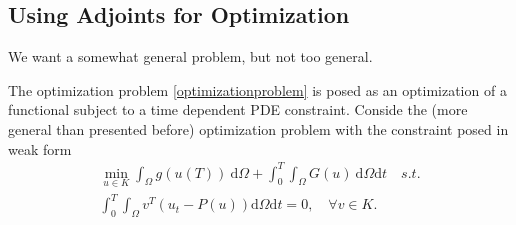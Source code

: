 \documentclass[10pt]{article}
\renewcommand{\d}{\mathrm{d}}
\begin{document}
{\subsection{Using Adjoints for Optimization}

We want a somewhat general problem, but not too general.

The optimization problem \ref{optimizationproblem} is posed as an optimization of a functional subject to a time dependent PDE constraint.
Conside the (more general than presented before)
optimization problem with the constraint posed in weak form
\begin{eqnarray}
  \min_{u \in K} \int_{\Omega}g(u(T)) \ \d \Omega + \int_0^T\int_{\Omega}G(u) \ \d \Omega \d t \quad s.t. \\ \nonumber
  \int_0^T \int_{\Omega} v^T( u_t- P( u))  \d \Omega \d t = 0, \quad \forall v \in K.
\label{newoptimizationproblem}
\end{eqnarray}


}
\end{document}
